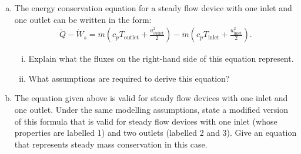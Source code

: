 \documentclass[calculator,steamtables,refrigeranttables,psychrometricchart,datasheet]{exam}
\begin{document}
\begin{question}
\begin{enumerate}[(a)]
\end{enumerate}

%
\end{question}

\clearpage


\begin{question} 
\begin{enumerate}[(a)]
\item The energy conservation equation for a steady flow device with one inlet and one outlet can be written in the form:
\begin{align*}
 \dot{Q}-\dot{W}_{s} = \dot{m} \left(c_p T_\text{outlet} + \frac{u_{\text{outlet}}^2}{2}\right) - \dot{m} \left(c_p T_\text{inlet} + \frac{u_{\text{inlet}}^2}{2}\right).
\end{align*}
\begin{enumerate}[(i)]
\item Explain what the fluxes on the right-hand side of this equation represent. 
\item What assumptions are required to derive this equation? 
\end{enumerate}

\item The equation given above is valid for steady flow devices with one inlet and one outlet. Under the same modelling assumptions, state a modified version of this formula that is valid for steady flow devices with one inlet (whose properties are labelled 1) and two outlets (labelled 2 and 3). Give an equation that represents steady mass conservation in this case. 
\end{enumerate}
\end{question}
\end{document}
